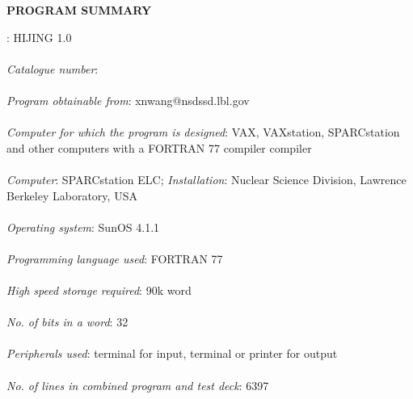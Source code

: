 \newcommand{\lsim}
{\ \raisebox{2.75pt}{$<$}\hspace{-9.0pt}\raisebox{-2.75pt}{$\sim$}\ }
\newcommand{\gsim}
{\ \raisebox{2.75pt}{$>$}\hspace{-9.0pt}\raisebox{-2.75pt}{$\sim$}\ }

\baselineskip=18pt
\parindent=0.25in
\abovedisplayskip=24pt
\belowdisplayskip=24pt


\begin{center}
{\Large\bf PROGRAM SUMMARY}
\end{center}

: HIJING 1.0\\
\vspace{0pt}\\
{\em Catalogue number}:\\
\vspace{0pt}\\
{\em Program obtainable from}: xnwang@nsdssd.lbl.gov\\
\vspace{0pt}\\
{\em Computer for which the program is designed}: VAX, VAXstation, 
SPARCstation and other computers with a FORTRAN 77 compiler
compiler\\
\vspace{0pt}\\
{\em Computer}: SPARCstation ELC; {\em Installation}: Nuclear Science Division,
Lawrence Berkeley Laboratory, USA\\
\vspace{0pt}\\
{\em Operating system}: SunOS 4.1.1\\
\vspace{0pt}\\
{\em Programming language used}: FORTRAN 77\\
\vspace{0pt}\\
{\em High speed storage required}: 90k word\\
\vspace{0pt}\\
{\em No. of bits  in a word}: 32\\
\vspace{0pt}\\
{\em Peripherals used}: terminal for input, terminal or printer for output\\
\vspace{0pt}\\
{\em No. of lines in combined program and test deck}: 6397 \\
